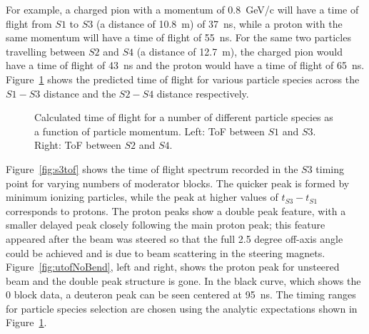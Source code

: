 For example, a charged pion with a momentum of 0.8~GeV/c will have a time of flight from $\mathit{S1}$ to $\mathit{S3}$ (a distance of 10.8~m) of 37~ns, while a proton with the same momentum will have a time of flight of 55~ns.
For the same two particles travelling between $\mathit{S2}$ and $\mathit{S4}$ (a distance of 12.7~m), the charged pion would have a time of flight of 43~ns and the proton would have a time of flight of 65~ns.
Figure~\ref{fig:s1s3PredTimes} shows the predicted time of flight for various particle species across the $\mathit{S1}-\mathit{S3}$ distance and the $\mathit{S2}-\mathit{S4}$ distance respectively.

\begin{figure}[ht]
  
  \begin{minipage}[t]{0.49\textwidth}
    \begin{adjustbox}{max totalsize={\textwidth}{.5\textheight},center}
      
    \end{adjustbox}
  \end{minipage}
  \hfill
  \begin{minipage}[t]{0.49\textwidth}
    \begin{adjustbox}{max totalsize={\textwidth}{.5\textheight},center}
      
    \end{adjustbox}
  \end{minipage}
   \caption{\label{fig:s1s3PredTimes}Calculated time of flight for a number of different particle species as a function of particle momentum. Left: ToF between $\mathit{S1}$ and $\mathit{S3}$. Right: ToF between $\mathit{S2}$ and $\mathit{S4}$.}
\end{figure}

Figure~\ref{fig:s3tof} shows the time of flight spectrum recorded in the $\mathit{S3}$ timing point for varying numbers of moderator blocks.
The quicker peak is formed by minimum ionizing particles, while the peak at higher values of $\mathit{t_{S3}} - \mathit{t_{S1}}$ corresponds to protons.
The proton peaks show a double peak feature, with a smaller delayed peak closely following the main proton peak; this feature appeared after the beam was steered so that the full 2.5 degree off-axis angle could be achieved and is due to beam scattering in the steering magnets.
Figure~\ref{fig:utofNoBend}, left and right, shows the proton peak for unsteered beam and the double peak structure is gone.
In the black curve, which shows the 0 block data, a deuteron peak can be seen centered at 95~ns.
The timing ranges for particle species selection are chosen using the analytic expectations shown in Figure~\ref{fig:s1s3PredTimes}.

